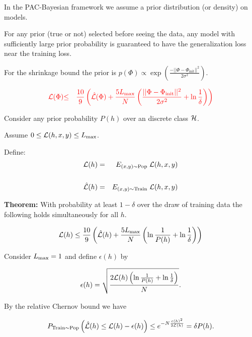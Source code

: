 {

\vfill
In the PAC-Bayesian framework we assume a prior distribution (or density) on models.

\vfill
For any prior (true or not) selected before seeing the data, any model with sufficiently large prior probability is guaranteed to have the generalization loss near the training loss.

\vfill
For the shrinkage bound the prior is $p(\Phi) \propto  \exp\left(\frac{-||\Phi -\Phi_{\mathrm{init}}||^2}{2\sigma^2}\right)$.

\begin{eqnarray*}
   {\color{red} {\cal L}(\Phi)} & {\color{red} \leq} & {\color{red} \frac{10}{9}\left(\hat{{\cal L}}(\Phi)
   + \frac{5 L_{\max}}{N}\left(\frac{||\Phi-\Phi_{\mathrm{init}}||^2}{2\sigma^2} + \ln \frac{1}{\delta}\right)\right)}
\end{eqnarray*}



Consider any prior probability $P(h)$ over an discrete class ${\cal H}$.

\vfill
Assume $0 \leq {\cal L}(h,x,y) \leq L_{\max}$.

\vfill
Define:
\begin{eqnarray*}
{\cal L}(h)  & = &  E_{(x,y)\sim \mathrm{Pop}}\;{\cal L}(h,x,y) \\
\\
\hat{{\cal L}}(h) & = & E_{(x,y)\sim \mathrm{Train}}\;{\cal L}(h,x,y)
\end{eqnarray*}

\vfill
    {\bf Theorem:} With probability
    at least $1-\delta$ over the draw of training data the following holds simultaneously for all $h$.

\vfill
    $${\cal L}(h) \leq \frac{10}{9}\left(\hat{\cal L}(h) + \frac{5 L_\mathrm{max}}{N}\left(\ln \frac{1}{P(h)} + \ln\frac{1}{\delta}\right)\right)$$


Consider $L_{\max} = 1$ and define $\epsilon(h)$ by

\vfill
$$\epsilon(h) = \sqrt{\frac{2{\cal L}(h)\left(\ln\frac{1}{P(h)} + \ln\frac{1}{\delta}\right)}{N}}.$$

\vfill
By the relative Chernov bound we have

\vfill
$$P_{\mathrm{Train} \sim \mathrm{Pop}}\left(\hat{{\cal L}}(h) \leq {\cal L}(h) - \epsilon(h)\right) \leq e^{-N\frac{\epsilon(h)^2}{2{\cal L}(h)}} = \delta P(h).$$

}
